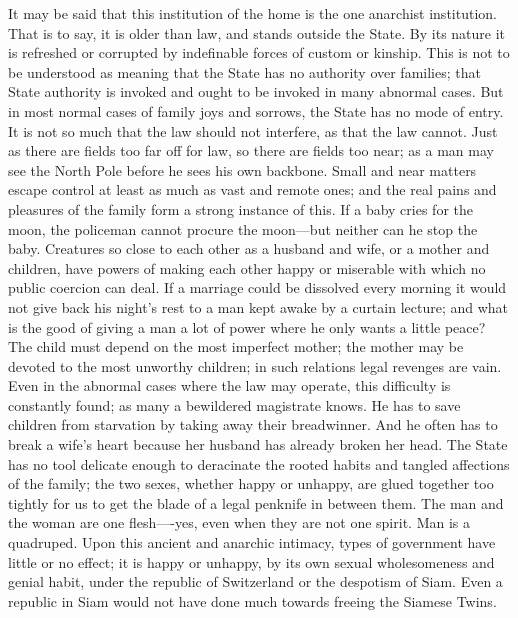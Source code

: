 \documentclass{book}
\begin{document}
It may be said that this institution of the home is the one anarchist institution. That is to say, it is older than law, and stands outside the State. By its nature it is refreshed or corrupted by indefinable forces of custom or kinship. This is not to be understood as meaning that the State has no authority over families; that State authority is invoked and ought to be invoked in many abnormal cases. But in most normal cases of family joys and sorrows, the State has no mode of entry. It is not so much that the law should not interfere, as that the law cannot. Just as there are fields too far off for law, so there are fields too near; as a man may see the North Pole before he sees his own backbone. Small and near matters escape control at least as much as vast and remote ones; and the real pains and pleasures of the family form a strong instance of this. If a baby cries for the moon, the policeman cannot procure the moon—but neither can he stop the baby. Creatures so close to each other as a husband and wife, or a mother and children, have powers of making each other happy or miserable with which no public coercion can deal. If a marriage could be dissolved every morning it would not give back his night’s rest to a man kept awake by a curtain lecture; and what is the good of giving a man a lot of power where he only wants a little peace? The child must depend on the most imperfect mother; the mother may be devoted to the most unworthy children; in such relations legal revenges are vain. Even in the abnormal cases where the law may operate, this difficulty is constantly found; as many a bewildered magistrate knows. He has to save children from starvation by taking away their breadwinner. And he often has to break a wife’s heart because her husband has already broken her head. The State has no tool delicate enough to deracinate the rooted habits and tangled affections of the family; the two sexes, whether happy or unhappy, are glued together too tightly for us to get the blade of a legal penknife in between them. The man and the woman are one flesh—-yes, even when they are not one spirit. Man is a quadruped. Upon this ancient and anarchic intimacy, types of government have little or no effect; it is happy or unhappy, by its own sexual wholesomeness and genial habit, under the republic of Switzerland or the despotism of Siam. Even a republic in Siam would not have done much towards freeing the Siamese Twins.
\end{document}
